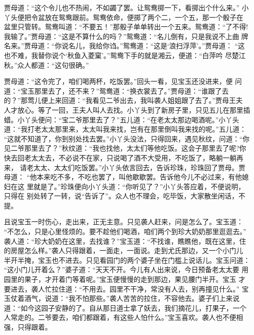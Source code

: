 贾母道：“这个令儿也不热闹，不如蠲了罢。让鸳鸯掷一下，看掷出个什么来。”
小丫头便把令盆放在鸳鸯跟前。鸳鸯依命，便掷了两个二，一个五，那一个骰子在
盆里只管转。鸳鸯叫道：“不要五！”那骰子单单转出一个五来。鸳鸯道：“了不得!
我输了。”贾母道：“这是不算什么的吗？”鸳鸯道：“名儿倒有，只是我说不上曲
牌名来。”贾母道：“你说名儿，我给你诌。”鸳鸯道：“这是‘浪扫浮萍’。”贾母道：
“这也不难，我替你说个‘秋鱼入菱窠’。”鸳鸯下手的就是湘云，便道：“白萍吟
尽楚江秋。”众人都道：“这句很确。”

贾母道：“这令完了，咱们喝两杯，吃饭罢。”回头一看，见宝玉还没进来，便
问道：“宝玉那里去了，还不来？”鸳鸯道：“换衣裳去了。”贾母道：“谁跟了去
的？”那莺儿便上来回道：“我看见二爷出去，我叫袭人姐姐跟了去了。”贾母王夫
人才放心。等了一回，王夫人叫人去找。小丫头到了新房子里，只见五儿在那里插
蜡。小丫头便问：“宝二爷那里去了？”五儿道：“在老太太那边喝酒呢。”小丫头
道：“我打老太太那里来，太太叫我来找，岂有在那里倒叫我来找的呢。”五儿道：
“这就不知道了，你到别处找去罢。”小丫头没法，只得回来，遇见秋纹，问道：“你
见二爷那里去了？”秋纹道：“我也找他，太太们等他吃饭。这会子那里去了呢?你
快去回老太太去，不必说不在家，只说喝了酒不大受用，不吃饭了，略躺一躺再来，
请老太太、太太们吃饭罢。”小丫头依言回去，告诉珍珠，珍珠回了贾母。贾母道：
“他本来吃不多，不吃也罢了，叫他歇歇罢。告诉他今儿不必过来，有他媳妇在这
里就是了。”珍珠便向小丫头道：“你听见了？”小丫头答应着，不便说明，只得在
别处转了一转，说“告诉了”。众人也不理会，吃毕饭，大家散坐闲话，不提。

且说宝玉一时伤心，走出来，正无主意。只见袭人赶来，问是怎么了。宝玉道：
“不怎么，只是心里怪烦的。要不趁他们喝酒，咱们两个到珍大奶奶那里逛逛去。”
袭人道：“珍大奶奶在这里，去找谁？”宝玉道：“不找谁，瞧瞧他，既在这里，住
的房屋怎么样。”袭人只得跟着，一面走，一面说。走到尤氏那边，又一个小门儿
半开半掩，宝玉也不进去。只见看园门的两个婆子坐在门槛上说话儿。宝玉问道：
“这小门儿开着么？”婆子道：“天天不开。今儿有人出来说，今日预备老太太要
用园里的果子，才开着门等着呢。”宝玉便慢慢的走到那边，果见腰门半开。宝玉
才要进去，袭人忙拉住道：“不用去。园里不干净，常没有人去，别再撞见什么。”
宝玉仗着酒气，说道：“我不怕那些。”袭人苦苦的拉住，不容他去。婆子们上来说
道：“如今这园子安静的了。自从那日道士拿了妖去，我们摘花儿，打果子，一个
人常走的。二爷要去，咱们都跟着，有这些人怕什么。”宝玉喜欢。袭人也不便相
强，只得跟着。

